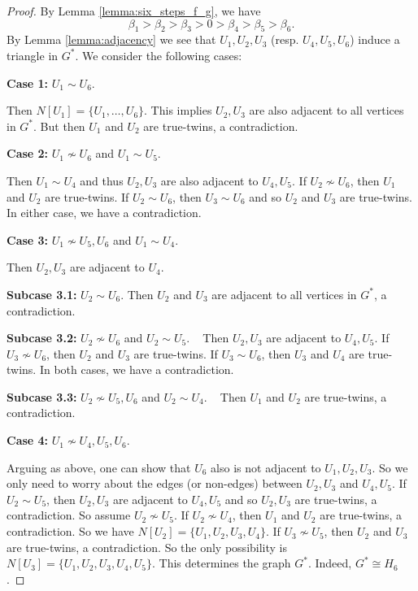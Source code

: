 \documentclass[11pt]{article}
\theoremstyle{plain}
\theoremstyle{definition}
\numberwithin{equation}{section}
\begin{document}
\begin{proof} 
By Lemma \ref{lemma:six_steps_f_g}, we have 
\[ 
\beta_1 > \beta_2 > \beta_3 > 0 > \beta_4 > \beta_5 > \beta_6.
\] 
By Lemma \ref{lemma:adjacency} we see that $U_1, U_2, U_3$ (resp. $U_4, U_5, U_6$) induce 
a triangle in $G^*$. We consider the following cases:

\textbf{Case 1:} $U_1 \sim U_6$.
    
Then $N[U_1] = \{U_1, \ldots, U_6\}$. This implies $U_2, U_3$ are also adjacent to all vertices in $G^*$. 
But then $U_1$ and $U_2$ are true-twins, a contradiction.

\textbf{Case 2:} $U_1\nsim U_6$ and $U_1\sim U_5$.

Then $U_1\sim U_4$ and thus $U_2, U_3$ are also adjacent to $U_4, U_5$. If $U_2\nsim U_6$, 
then $U_1$ and $U_2$ are true-twins. If $U_2\sim U_6$, then $U_3\sim U_6$ and so $U_2$ and 
$U_3$ are true-twins. In either case, we have a contradiction.

\textbf{Case 3:} $U_1\nsim U_5, U_6$ and $U_1\sim U_4$. 

Then $U_2, U_3$ are adjacent to $U_4$. 
    
\textbf{Subcase 3.1:} $U_2\sim U_6$. Then $U_2$ and $U_3$ are adjacent to all vertices in $G^*$, a contradiction. 

\textbf{Subcase 3.2:} $U_2\nsim U_6$ and $U_2\sim U_5$. ~  Then $U_2,U_3$ are adjacent to $U_4, U_5$. 
If $U_3\nsim U_6$, then $U_2$ and $U_3$ are true-twins. If $U_3\sim U_6$, then $U_3$ and $U_4$ are true-twins. 
In both cases, we have a contradiction.

\textbf{Subcase 3.3:} $U_2\nsim U_5, U_6$ and $U_2\sim U_4$. ~ Then $U_1$ and $U_2$ are true-twins, a contradiction.

\textbf{Case 4:} $U_1\nsim U_4, U_5, U_6$.

Arguing as above, one can show that $U_6$ also is not adjacent to $U_1,U_2, U_3$. So we only need to 
worry about the edges (or non-edges) between $U_2, U_3$ and $U_4, U_5$. If $U_2\sim U_5$, then $U_2, U_3$ 
are adjacent to $U_4, U_5$ and so $U_2, U_3$ are true-twins, a contradiction. So assume $U_2\nsim U_5$. 
If $U_2\nsim U_4$, then $U_1$ and $U_2$ are true-twins, a contradiction. So we have $N[U_2] = \{U_1, U_2, U_3, U_4\}$. 
If $U_3\nsim U_5$, then $U_2$ and $U_3$ are true-twins, a contradiction. So the only possibility is 
$N[U_3] = \{U_1, U_2, U_3, U_4, U_5\}$. This determines the graph $G^*$. Indeed, $G^*\cong H_6$. 
\end{proof}
\end{document}
